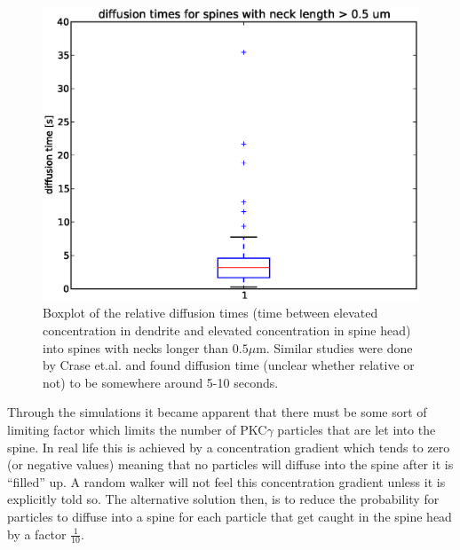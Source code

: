 \begin{figure}[h]
 \centering
 \includegraphics[scale=0.5]{Figures/spine_stats_boxplot_reltime_longneck.eps}
 \caption[Diffusion time for long necked spines]{Boxplot of the relative diffusion times (time between elevated concentration in dendrite and elevated concentration in spine head) into spines with necks longer than $0.5\mu$m. Similar studies were done by Crase et.al. and found diffusion time (unclear whether relative or not) to be somewhere around 5-10 seconds.}
 \label{results:boxplot_relative_diffusiontime_long_neck}
\end{figure}

Through the simulations it became apparent that there must be some sort of limiting factor which limits the number of PKC$\gamma$ particles that are let into the spine. 
In real life this is achieved by a concentration gradient which tends to zero (or negative values) meaning that no particles will diffuse into the spine after it is ``filled'' up. 
A random walker will not feel this concentration gradient unless it is explicitly told so. 
The alternative solution then, is to reduce the probability for particles to diffuse into a spine for each particle that get caught in the spine head by a factor $\frac{1}{10}$. 